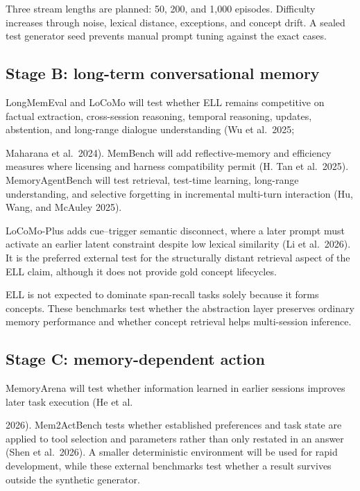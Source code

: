 \documentclass[
  english,
  a4paper,
  DIV=11,
  numbers=noendperiod]{scrreprt}
\begin{document}
Three stream lengths are planned: 50, 200, and 1,000 episodes.
Difficulty increases through noise, lexical distance, exceptions, and
concept drift. A sealed test generator seed prevents manual prompt
tuning against the exact cases.

\subsection{Stage B: long-term conversational
memory}\label{stage-b-long-term-conversational-memory}

LongMemEval and LoCoMo will test whether ELL remains competitive on
factual extraction, cross-session reasoning, temporal reasoning,
updates, abstention, and long-range dialogue understanding (Wu et
al.~2025;

Maharana et al.~2024). MemBench will add reflective-memory and
efficiency measures where licensing and harness compatibility permit (H.
Tan et al.~2025). MemoryAgentBench will test retrieval, test-time
learning, long-range understanding, and selective forgetting in
incremental multi-turn interaction (Hu, Wang, and McAuley 2025).

LoCoMo-Plus adds cue--trigger semantic disconnect, where a later prompt
must activate an earlier latent constraint despite low lexical
similarity (Li et al.~2026). It is the preferred external test for the
structurally distant retrieval aspect of the ELL claim, although it does
not provide gold concept lifecycles.

ELL is not expected to dominate span-recall tasks solely because it
forms concepts. These benchmarks test whether the abstraction layer
preserves ordinary memory performance and whether concept retrieval
helps multi-session inference.

\subsection{Stage C: memory-dependent
action}\label{stage-c-memory-dependent-action}

MemoryArena will test whether information learned in earlier sessions
improves later task execution (He et al.

2026). Mem2ActBench tests whether established preferences and task state
are applied to tool selection and parameters rather than only restated
in an answer (Shen et al.~2026). A smaller deterministic environment
will be used for rapid development, while these external benchmarks test
whether a result survives outside the synthetic generator.
\end{document}
